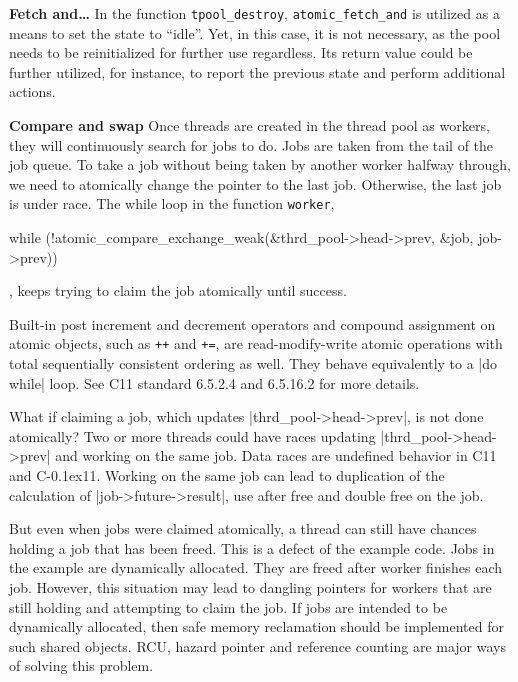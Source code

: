 \documentclass[fontsize=10pt, oneside]{scrartcl}
\newcommand{\monobox}[1]{\mbox{\texttt{#1}}}
\newcommand{\cplusplus}[1]{C\kern-0.1ex\raisebox{0.15ex}{\texttt{++}}#1}
\newcommand{\clang}[1]{C#1}
\begin{document}
\textbf{Fetch and…}
In the function \monobox{tpool\_destroy}, \monobox{atomic\_fetch\_and} is utilized as a means to set the state to ``idle''. 
Yet, in this case, it is not necessary, as the pool needs to be reinitialized for further use regardless.
Its return value could be further utilized, for instance, to report the previous state and perform additional actions.

\textbf{Compare and swap}
Once threads are created in the thread pool as workers, they will continuously search for jobs to do.
Jobs are taken from the tail of the job queue.
To take a job without being taken by another worker halfway through, we need to atomically change the pointer to the last job. 
Otherwise, the last job is under race.
The while loop in the function \monobox{worker},
\begin{ccode}
while (!atomic_compare_exchange_weak(&thrd_pool->head->prev, &job,
                                       job->prev)) {
}
\end{ccode}
, keeps trying to claim the job atomically until success.

Built-in post increment and decrement operators and compound assignment on atomic objects, such as \monobox{++} and \monobox{+=}, are read-modify-write atomic operations with total sequentially consistent ordering as well. 
They behave equivalently to a \cc|do while| loop. See \clang{}11 standard 6.5.2.4 and 6.5.16.2 for more details.

What if claiming a job, which updates \cc|thrd_pool->head->prev|, is not done atomically?
Two or more threads could have races updating \cc|thrd_pool->head->prev| and working on the same job.
Data races are undefined behavior in \clang{}11 and \cplusplus{}11.
Working on the same job can lead to duplication of the calculation of \cc|job->future->result|, 
use after free and double free on the job.

But even when jobs were claimed atomically, a thread can still have chances holding a job that has been freed.
This is a defect of the example code.
Jobs in the example are dynamically allocated. They are freed after worker finishes each job. 
However, this situation may lead to dangling pointers for workers that are still holding and attempting to claim the job. 
If jobs are intended to be dynamically allocated, then safe memory reclamation should be implemented for such shared objects.
RCU, hazard pointer and reference counting are major ways of solving this problem.
\end{document}
